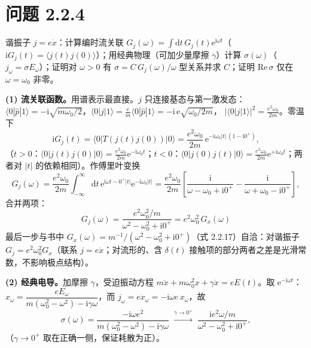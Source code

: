 \section*{问题 2.2.4}
\begin{problem}
谐振子 $j=e\dot x$：计算编时流关联 $G_j(\omega)=\int\mathrm{d}t\,G_j(t)\mathrm{e}^{\mathrm{i}\omega t}$（$\mathrm{i}G_j(t)=\langle j(t)j(0)\rangle$）；用经典物理（可加少量摩擦 $\gamma$）计算 $\sigma(\omega)$（$j_\omega=\sigma E_\omega$）；证明对 $\omega>0$ 有 $\sigma=C\,G_j(\omega)/\omega$ 型关系并求 $C$；证明 $\mathrm{Re}\,\sigma$ 仅在 $\omega=\omega_0$ 非零。
\end{problem}
\solution
\textbf{(1) 流关联函数。}用谱表示最直接。$j$ 只连接基态与第一激发态：
$\langle0|\hat p|1\rangle=-\mathrm{i}\sqrt{m\omega_0/2}$，$\langle0|j|1\rangle=\frac em\langle0|\hat p|1\rangle=-\mathrm{i}\,\mathrm{e}\sqrt{\omega_0/2m}$，
$|\langle0|j|1\rangle|^2=\frac{e^2\omega_0}{2m}$。零温下
\begin{equation*}
\mathrm{i}G_j(t)=\langle0|T(j(t)j(0))|0\rangle
=\frac{e^2\omega_0}{2m}\,\mathrm{e}^{-\mathrm{i}\omega_0|t|\,(1-\mathrm{i}0^+)} ,
\end{equation*}
（$t>0$：$\langle0|j(t)j(0)|0\rangle=\frac{e^2\omega_0}{2m}\mathrm{e}^{-\mathrm{i}\omega_0t}$；$t<0$：$\langle0|j(0)j(t)|0\rangle=\frac{e^2\omega_0}{2m}\mathrm{e}^{+\mathrm{i}\omega_0t}$；两者对 $|t|$ 的依赖相同）。作傅里叶变换
\begin{equation*}
G_j(\omega)=\frac{e^2\omega_0}{2m}\int_{-\infty}^{\infty}\mathrm{d}t\,
\mathrm{e}^{\mathrm{i}\omega t-0^+|t|}\mathrm{e}^{-\mathrm{i}\omega_0|t|}
=\frac{e^2\omega_0}{2m}\left[\frac{\mathrm{i}}{\omega-\omega_0+\mathrm{i}0^+}-\frac{\mathrm{i}}{\omega+\omega_0-\mathrm{i}0^+}\right],
\end{equation*}
合并两项：
\begin{equation*}
\boxed{\;G_j(\omega)=\frac{e^2\omega_0^2/m}{\omega^2-\omega_0^2+\mathrm{i}0^+}
= e^2\omega_0^2\,G_x(\omega)\;}
\end{equation*}
最后一步与书中 $G_x(\omega)=m^{-1}/(\omega^2-\omega_0^2+\mathrm{i}0^+)$（式 2.2.17）自洽：对谐振子 $G_j=e^2\omega_0^2G_x$（联系 $j=e\dot x$；对流形的、含 $\delta(t)$ 接触项的部分两者之差是光滑常数，不影响极点结构）。

\textbf{(2) 经典电导。}加摩擦 $\gamma$，受迫振动方程 $m\ddot x+m\omega_0^2x+\gamma\dot x=eE(t)$。取 $\mathrm{e}^{-\mathrm{i}\omega t}$：$x_\omega=\dfrac{eE_\omega}{m(\omega_0^2-\omega^2)-\mathrm{i}\gamma\omega}$，而 $j_\omega=e\dot x_\omega=-\mathrm{i}\omega e\,x_\omega$，故
\begin{equation*}
\sigma(\omega)=\frac{-\mathrm{i}\omega e^2}{m(\omega_0^2-\omega^2)-\mathrm{i}\gamma\omega}
\;\xrightarrow{\gamma\to0^+}\;
\frac{\mathrm{i}e^2\omega/m}{\omega^2-\omega_0^2+\mathrm{i}0^+},
\end{equation*}
（$\gamma\to0^+$ 取在正确一侧，保证耗散为正）。

